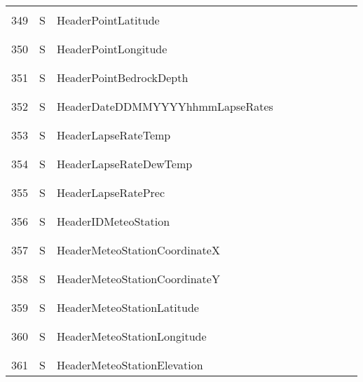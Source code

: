 \begin{longtable}{|c|c|l|c|c|c|c|p{}|c|p{}|}
&&&&&&&&&\\\hline%
&&&&&&&&&\\
349 & S & HeaderPointLatitude & & & & & & & \\
&&&&&&&&&\\\hline%
&&&&&&&&&\\
350 & S & HeaderPointLongitude & & & & & & & \\
&&&&&&&&&\\\hline%
&&&&&&&&&\\
351 & S & HeaderPointBedrockDepth & & & & & & & \\
&&&&&&&&&\\\hline%
&&&&&&&&&\\
352 & S & HeaderDateDDMMYYYYhhmmLapseRates & & & & & & & \\
&&&&&&&&&\\\hline%
&&&&&&&&&\\
353 & S & HeaderLapseRateTemp & & & & & & & \\
&&&&&&&&&\\\hline%
&&&&&&&&&\\
354 & S & HeaderLapseRateDewTemp & & & & & & & \\
&&&&&&&&&\\\hline%
&&&&&&&&&\\
355 & S & HeaderLapseRatePrec & & & & & & & \\
&&&&&&&&&\\\hline%
&&&&&&&&&\\
356 & S & HeaderIDMeteoStation & & & & & & & \\
&&&&&&&&&\\\hline%
&&&&&&&&&\\
357 & S & HeaderMeteoStationCoordinateX & & & & & & & \\
&&&&&&&&&\\\hline%
&&&&&&&&&\\
358 & S & HeaderMeteoStationCoordinateY & & & & & & & \\
&&&&&&&&&\\\hline%
&&&&&&&&&\\
359 & S & HeaderMeteoStationLatitude & & & & & & & \\
&&&&&&&&&\\\hline%
&&&&&&&&&\\
360 & S & HeaderMeteoStationLongitude & & & & & & & \\
&&&&&&&&&\\\hline%
&&&&&&&&&\\
361 & S & HeaderMeteoStationElevation & & & & & & & \\

\end{longtable}
